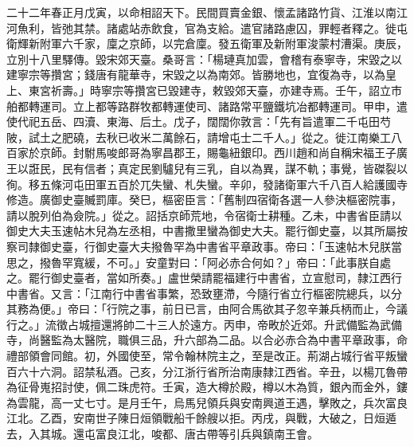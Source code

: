 \begin{pinyinscope}
 二十二年春正月戊寅，以命相詔天下。民間買賣金銀、懷孟諸路竹貨、江淮以南江河魚利，皆弛其禁。諸處站赤飲食，官為支給。遣官諸路慮囚，罪輕者釋之。徙屯衛輝新附軍六千家，廩之京師，以完倉廩。發五衛軍及新附軍浚蒙村漕渠。庚辰，立別十八里驛傳。毀宋郊天臺。桑哥言：「楊璉真加雲，會稽有泰寧寺，宋毀之以建寧宗等攢宮；錢唐有龍華寺，宋毀之以為南郊。皆勝地也，宜復為寺，以為皇上、東宮祈壽。」時寧宗等攢宮已毀建寺，敕毀郊天臺，亦建寺焉。壬午，詔立市舶都轉運司。立上都等路群牧都轉運使司、諸路常平鹽鐵坑冶都轉運司。甲申，遣使代祀五岳、四瀆、東海、后土。戊子，闊闊你敦言：「先有旨遣軍二千屯田芍陂，試土之肥磽，去秋已收米二萬餘石，請增屯士二千人。」從之。徙江南樂工八百家於京師。封駙馬唆郎哥為寧昌郡王，賜龜紐銀印。西川趙和尚自稱宋福王子廣王以誑民，民有信者；真定民劉驢兒有三乳，自以為異，謀不軌；事覺，皆磔裂以徇。移五條河屯田軍五百於兀失蠻、札失蠻。辛卯，發諸衛軍六千八百人給護國寺修造。廣御史臺贓罰庫。癸巳，樞密臣言：「舊制四宿衛各選一人參決樞密院事，請以脫列伯為僉院。」從之。詔括京師荒地，令宿衛士耕種。乙未，中書省臣請以御史大夫玉速帖木兒為左丞相，中書撒里蠻為御史大夫。罷行御史臺，以其所屬按察司隸御史臺，行御史臺大夫撥魯罕為中書省平章政事。帝曰：「玉速帖木兒朕當思之，撥魯罕寬緩，不可。」安童對曰：「阿必赤合何如？」帝曰：「此事朕自處之。罷行御史臺者，當如所奏。」盧世榮請罷福建行中書省，立宣慰司，隸江西行中書省。又言：「江南行中書省事繁，恐致壅滯，今隨行省立行樞密院總兵，以分其務為便。」帝曰：「行院之事，前日已言，由阿合馬欲其子忽辛兼兵柄而止，今議行之。」流徵占城擅還將帥二十三人於遠方。丙申，帝畋於近郊。升武備監為武備寺，尚醫監為太醫院，職俱三品，升六部為二品。以合必赤合為中書平章政事，命禮部領會同館。初，外國使至，常令翰林院主之，至是改正。荊湖占城行省平叛蠻百六十六洞。詔禁私酒。己亥，分江浙行省所治南康隸江西省。辛丑，以楊兀魯帶為征骨嵬招討使，佩二珠虎符。壬寅，造大樽於殿，樽以木為質，銀內而金外，鏤為雲龍，高一丈七寸。是月壬午，烏馬兒領兵與安南興道王遇，擊敗之，兵次富良江北。乙酉，安南世子陳日烜領戰船千餘艘以拒。丙戌，與戰，大破之，日烜遁去，入其城。還屯富良江北，唆都、唐古帶等引兵與鎮南王會。




\end{pinyinscope}
